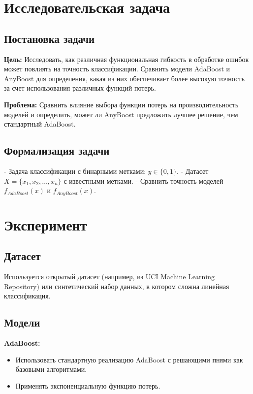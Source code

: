 \section*{Исследовательская задача}
\subsection*{Постановка задачи}
\textbf{Цель:} Исследовать, как различная функциональная гибкость в обработке ошибок может повлиять на точность классификации. Сравнить модели AdaBoost и AnyBoost для определения, какая из них обеспечивает более высокую точность за счет использования различных функций потерь.

\textbf{Проблема:} Сравнить влияние выбора функции потерь на производительность моделей и определить, может ли AnyBoost предложить лучшее решение, чем стандартный AdaBoost.

\subsection*{Формализация задачи}

- Задача классификации с бинарными метками: $y \in \{0, 1\}$.
- Датасет $X = \{x_1, x_2, \ldots, x_n\}$ с известными метками.
- Сравнить точность моделей $f_{AdaBoost}(x)$ и $f_{AnyBoost}(x)$.

\section*{Эксперимент}

\subsection*{Датасет}
Используется открытый датасет (например, из UCI Machine Learning Repository) или синтетический набор данных, в котором сложна линейная классификация.

\subsection*{Модели}

\textbf{AdaBoost:}
\begin{itemize}
    \item Использовать стандартную реализацию AdaBoost с решающими пнями как базовыми алгоритмами.
    \item Применять экспоненциальную функцию потерь.
\end{itemize}

